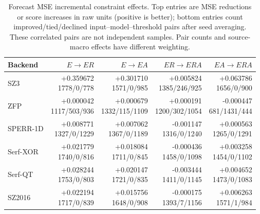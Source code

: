 \begin{table}[t]
\centering
\small
\setlength{\tabcolsep}{5pt}
\caption{Forecast MSE incremental constraint effects. Top entries are MSE reductions or score increases in raw units (positive is better); bottom entries count improved/tied/declined input--model--threshold pairs after seed averaging. These correlated pairs are not independent samples. Pair counts and source-macro effects have different weighting.}
\label{tab:s-ablation-contrast-forecast-mse}
\begin{tabular}{@{}lrrrr@{}}
\toprule
Backend & $E\to ER$ & $E\to EA$ & $ER\to ERA$ & $EA\to ERA$ \\
\midrule
SZ3 & \shortstack[r]{+0.359672\\1778/0/778} & \shortstack[r]{+0.301710\\1571/0/985} & \shortstack[r]{+0.005824\\1385/246/925} & \shortstack[r]{+0.063786\\1656/0/900} \\
ZFP & \shortstack[r]{+0.000042\\1117/503/936} & \shortstack[r]{+0.000679\\1332/115/1109} & \shortstack[r]{+0.000191\\1200/302/1054} & \shortstack[r]{-0.000447\\681/1431/444} \\
SPERR-1D & \shortstack[r]{+0.008771\\1327/0/1229} & \shortstack[r]{+0.007062\\1367/0/1189} & \shortstack[r]{-0.001147\\1316/0/1240} & \shortstack[r]{+0.000563\\1265/0/1291} \\
Serf-XOR & \shortstack[r]{+0.021779\\1740/0/816} & \shortstack[r]{+0.018084\\1711/0/845} & \shortstack[r]{-0.000436\\1458/0/1098} & \shortstack[r]{+0.003258\\1454/0/1102} \\
Serf-QT & \shortstack[r]{+0.028244\\1753/0/803} & \shortstack[r]{+0.020147\\1721/0/835} & \shortstack[r]{-0.003444\\1411/0/1145} & \shortstack[r]{+0.004652\\1473/0/1083} \\
SZ2016 & \shortstack[r]{+0.022194\\1717/0/839} & \shortstack[r]{+0.015756\\1648/0/908} & \shortstack[r]{-0.000175\\1393/7/1156} & \shortstack[r]{+0.006263\\1571/1/984} \\
\bottomrule
\end{tabular}
\end{table}

